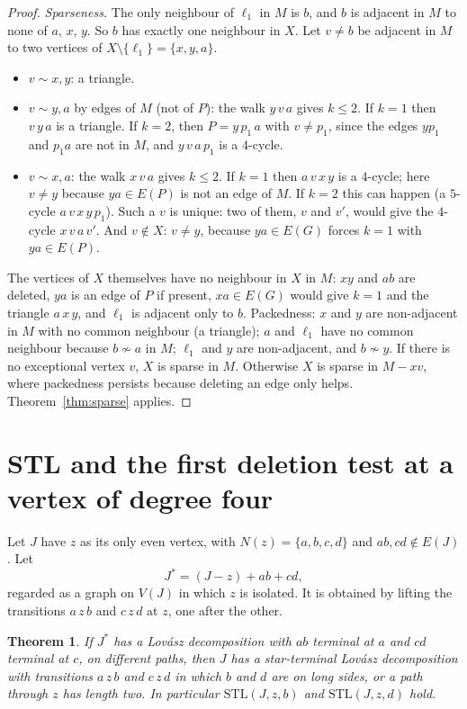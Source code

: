 \documentclass[11pt]{amsart}
\newtheorem{theorem}{Theorem}[section]
\theoremstyle{definition}
\newcommand{\lean}[1]{\quad{\footnotesize[Lean: \texttt{#1}]}}
\newcommand{\STL}{\mathrm{STL}}
\begin{document}
\begin{proof}
\emph{Sparseness.} The only neighbour of $\ell_1$ in $M$ is $b$, and $b$ is adjacent in $M$ to
none of $a$, $x$, $y$. So $b$ has exactly one neighbour in $X$. Let $v\ne b$ be adjacent in $M$ to
two vertices of $X\setminus\{\ell_1\}=\{x,y,a\}$.
\begin{itemize}
\item $v\sim x,y$: a triangle.
\item $v\sim y,a$ by edges of $M$ (not of $P$): the walk $y\,v\,a$ gives $k\le2$. If $k=1$ then
$v\,y\,a$ is a triangle. If $k=2$, then $P=y\,p_1\,a$ with $v\ne p_1$, since the edges $yp_1$ and
$p_1a$ are not in $M$, and $y\,v\,a\,p_1$ is a $4$-cycle.
\item $v\sim x,a$: the walk $x\,v\,a$ gives $k\le2$. If $k=1$ then $a\,v\,x\,y$ is a $4$-cycle;
here $v\ne y$ because $ya\in E(P)$ is not an edge of $M$.
If $k=2$ this can happen (a $5$-cycle $a\,v\,x\,y\,p_1$). Such a $v$ is unique: two of them, $v$
and $v'$, would give the $4$-cycle $x\,v\,a\,v'$. And $v\notin X$: $v\ne y$, because $ya\in E(G)$
forces $k=1$ with $ya\in E(P)$.
\end{itemize}
The vertices of $X$ themselves have no neighbour in $X$ in $M$: $xy$ and $ab$ are deleted, $ya$ is
an edge of $P$ if present, $xa\in E(G)$ would give $k=1$ and the triangle $a\,x\,y$, and
$\ell_1$ is adjacent only to $b$. Packedness: $x$ and $y$ are non-adjacent in $M$ with no common
neighbour (a triangle); $a$ and $\ell_1$ have no common neighbour because $b\not\sim a$ in $M$;
$\ell_1$ and $y$ are non-adjacent, and $b\not\sim y$. If there is no exceptional vertex $v$, $X$
is sparse in $M$. Otherwise $X$ is sparse in $M-xv$, where packedness persists because deleting an
edge only helps. Theorem~\ref{thm:sparse} applies.
\end{proof}

\section{STL and the first deletion test at a vertex of degree four}\label{sec:stl}

Let $J$ have $z$ as its only even vertex, with $N(z)=\{a,b,c,d\}$ and $ab,cd\notin E(J)$. Let
\[
J^\ast=(J-z)+ab+cd,
\]
regarded as a graph on $V(J)$ in which $z$ is isolated. It is obtained by lifting the transitions
$a\,z\,b$ and $c\,z\,d$ at $z$, one after the other.\lean{liftJ, swapG}

\begin{theorem}\label{thm:stl}
If $J^\ast$ has a Lov\'asz decomposition with $ab$ terminal at $a$ and $cd$ terminal at $c$, on
different paths, then $J$ has a star-terminal Lov\'asz decomposition with transitions $a\,z\,b$
and $c\,z\,d$ in which $b$ and $d$ are on long sides, or a path through $z$ has length two. In
particular $\STL(J,z,b)$ and $\STL(J,z,d)$ hold.\lean{stl\_of\_ptm2}
\end{theorem}
\end{document}
